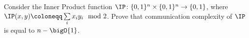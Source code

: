 Consider the Inner Product function $\IP\colon \{0, 1\}^n \times \{0, 1\}^n \to \{0, 1\}$, where
$\IP(x, y) \coloneqq \sum\limits_{i} x_{i}y_{i} \mod 2$. Prove that communication complexity of $\IP$ is
equal to $n - \bigO{1}$.

